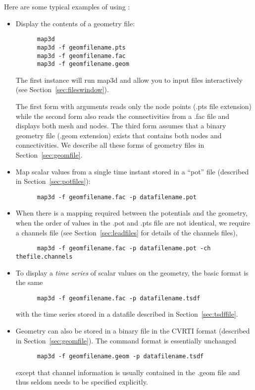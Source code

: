 \noindent
Here are some typical examples of using \map{}:
%
\begin{itemize}
  \item Display the contents of a geometry file:
  \begin{verbatim}
      map3d
      map3d -f geomfilename.pts
      map3d -f geomfilename.fac
      map3d -f geomfilename.geom

  \end{verbatim}
  \vspace{-.2in}
  The first instance will run map3d and allow you to input files interactively
  (see Section~\ref{sec:fileswindow}).
  
  The first form with arguments reads only the node points (.pts file
  extension) while the second form also reads the connectivities from a
  .fac file and displays both mesh and nodes.  The third form assumes that
  a binary geometry file (.geom extension) exists that contains both nodes
  and connectivities.  We describe all these forms of geometry files in
  Section~\ref{sec:geomfile}.
  
  \item Map scalar values from a single time instant stored in a ``pot''
  file (described in Section~\ref{sec:potfiles}):
  \begin{verbatim}
      map3d -f geomfilename.fac -p datafilename.pot
  \end{verbatim}

  \item When there is a mapping required between the potentials and the 
  geometry, \eg{} when the order of values in the .pot and .pts file 
  are not identical, we require a channels file (see 
  Section~\ref{sec:leadfiles} for details of the channels files),
  \begin{verbatim}
      map3d -f geomfilename.fac -p datafilename.pot -ch thefile.channels
  \end{verbatim}
   
  \item To display a \emph{time series} of scalar values on the geometry, 
  the basic format is the same
  \begin{verbatim}
      map3d -f geomfilename.fac -p datafilename.tsdf
  \end{verbatim}
  \vspace{-.2in}
  with the time series stored in a datafile described in
  Section~\ref{sec:tsdffile}.

  \item Geometry can also be stored in a binary file in the CVRTI 
  format (described in Section~\ref{sec:geomfile}).  The command 
  format is essentially unchanged
  \begin{verbatim}
      map3d -f geomfilename.geom -p datafilename.tsdf
  \end{verbatim}
  \vspace{-.2in}
  except that channel information is usually contained in the .geom 
  file and thus seldom needs to be specified explicitly.
  

\end{itemize}
